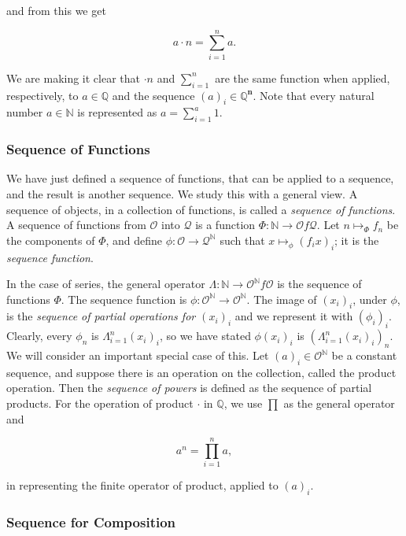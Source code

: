 \documentclass [12pt]{book}
\begin{document}
and from this we get

$$a\cdot n=\sum_{i=1}^na.$$

We are making it clear that $\cdot n$ and $\sum_{i=1}^n$ are the same function when applied, respectively, to $a\in\mathbb{Q}$ and the sequence $(a)_i\in\mathbb{Q}^\textbf{n}$. Note that every natural number $a\in\mathbb{N}$ is represented as $a=\sum_{i=1}^a1$.

		\subsubsection{Sequence of Functions}

We have just defined a sequence of functions, that can be applied to a sequence, and the result is another sequence. We study this with a general view. A sequence of objects, in a collection of functions, is called a \textit{sequence of functions}. A sequence of functions from $\mathcal O$ into $\mathcal Q$ is a function $\Phi:\mathbb N\rightarrow\mathcal Of\mathcal Q$. Let $n\mapsto_\Phi f_n$ be the components of $\Phi$, and define $\phi:\mathcal O\rightarrow\mathcal Q^\mathbb N$ such that $x\mapsto_\phi(f_ix)_i$; it is the \textit{sequence function}. 

In the case of series, the general operator $\Lambda:\mathbb N\rightarrow\mathcal O^\mathbb Nf\mathcal O$ is the sequence of functions $\Phi$. The sequence function is $\phi:\mathcal O^\mathbb N\rightarrow\mathcal O^\mathbb N$. The image of $(x_i)_i$, under $\phi$, is the \textit{sequence of partial operations for $(x_i)_i$} and we represent it with $(\phi_i)_i$. Clearly, every $\phi_n$ is $\Lambda_{i=1}^n(x_i)_i$, so we have stated $\phi(x_i)_i$ is $\left(\Lambda_{i=1}^n(x_i)_i\right)_n$. We will consider an important special case of this. Let $(a)_i\in\mathcal O^\mathbb N$ be a constant sequence, and suppose there is an operation on the collection, called the product operation. Then the \textit{sequence of powers} is defined as the sequence of partial products. For the operation of product $\cdot$ in $\mathbb Q$, we use $\prod$ as the general operator and

$$a^n=\prod_{i=1}^na,$$

in representing the finite operator of product, applied to $(a)_i$.

		\subsubsection{Sequence for Composition} 
\end{document}
